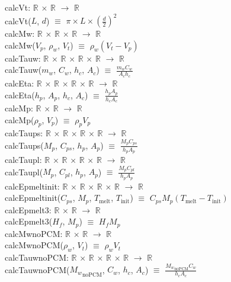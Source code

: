 \documentclass[12pt]{article}
\begin{document}
calcVt: $\mathbb{R}$ $\times$ $\mathbb{R}$ $\rightarrow$ $\mathbb{R}$ \\
calcVt($L$, $d$) $\equiv$ $\pi \times L \times (\frac{d}{2}) ^ 2$ \\
\newline
calcMw: $\mathbb{R}$ $\times$ $\mathbb{R}$ $\times$ $\mathbb{R}$ $\rightarrow$ $\mathbb{R}$ \\
calcMw($V_p$, $\rho_w$, $V_t$) $\equiv$ $\rho_w (V_t - V_p)$ \\
\newline
calcTauw: $\mathbb{R}$ $\times$ $\mathbb{R}$ $\times$ $\mathbb{R}$ $\times$ $\mathbb{R}$ $\rightarrow$ $\mathbb{R}$ \\
calcTauw($m_w$, $C_w$, $h_c$, $A_c$) $\equiv$ $\frac{m_w C_w}{A_c h_c}$ \\
\newline
calcEta: $\mathbb{R}$ $\times$ $\mathbb{R}$ $\times$ $\mathbb{R}$ $\times$ $\mathbb{R}$ $\rightarrow$ $\mathbb{R}$ \\
calcEta($h_p$, $A_p$, $h_c$, $A_c$) $\equiv$ $\frac{h_p A_p}{h_c A_c}$ \\
\newline
calcMp: $\mathbb{R}$ $\times$ $\mathbb{R}$ $\rightarrow$ $\mathbb{R}$ \\
calcMp($\rho_p$, $V_p$) $\equiv$ $\rho_p V_p$ \\
\newline
calcTaups: $\mathbb{R}$ $\times$ $\mathbb{R}$ $\times$ $\mathbb{R}$ $\times$ $\mathbb{R}$ $\rightarrow$ $\mathbb{R}$ \\
calcTaups($M_p$, $C_{ps}$, $h_p$, $A_p$) $\equiv$ $\frac{M_p C_{ps}}{h_p A_p}$ \\
\newline
calcTaupl: $\mathbb{R}$ $\times$ $\mathbb{R}$ $\times$ $\mathbb{R}$ $\times$ $\mathbb{R}$ $\rightarrow$ $\mathbb{R}$ \\
calcTaupl($M_p$, $C_{pl}$, $h_p$, $A_p$) $\equiv$ $\frac{M_p C_{pl}}{h_p A_p}$ \\
\newline
calcEpmeltinit: $\mathbb{R}$ $\times$ $\mathbb{R}$ $\times$ $\mathbb{R}$ $\times$ $\mathbb{R}$ $\rightarrow$ $\mathbb{R}$ \\
calcEpmeltinit($C_{ps}$, $M_p$, $T_{\text{melt}}$, $T_{\text{init}}$) $\equiv$ $C_{ps} M_p (T_{\text{melt}} - T_{\text{init}})$ \\
\newline
calcEpmelt3: $\mathbb{R}$ $\times$ $\mathbb{R}$ $\rightarrow$ $\mathbb{R}$ \\
calcEpmelt3($H_f$, $M_p$) $\equiv$ $H_f M_p$ \\
\newline
calcMwnoPCM: $\mathbb{R}$ $\times$ $\mathbb{R}$ $\rightarrow$ $\mathbb{R}$ \\
calcMwnoPCM($\rho_w$, $V_t$) $\equiv$ $\rho_w  V_t$ \\
\newline
calcTauwnoPCM: $\mathbb{R}$ $\times$ $\mathbb{R}$ $\times$ $\mathbb{R}$ $\times$ $\mathbb{R}$ $\rightarrow$ $\mathbb{R}$ \\
calcTauwnoPCM(${M_w}_{\text{noPCM}}$, $C_w$, $h_c$, $A_c$) $\equiv$
$\frac{{M_w}_{\text{noPCM}} C_w}{h_c A_c}$ \\
\end{document}
